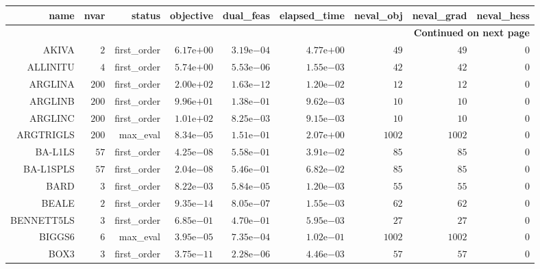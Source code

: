 \begin{longtable}{rrrrrrrrr}
\hline
name & nvar & status & objective & dual\_feas & elapsed\_time & neval\_obj & neval\_grad & neval\_hess \\\hline
\endhead
\hline
\multicolumn{9}{r}{{\bfseries Continued on next page}}\\
\hline
\endfoot
\endlastfoot
AKIVA & \(     2\) & first\_order & \( 6.17\)e\(+00\) & \( 3.19\)e\(-04\) & \( 4.77\)e\(+00\) & \(    49\) & \(    49\) & \(     0\) \\
ALLINITU & \(     4\) & first\_order & \( 5.74\)e\(+00\) & \( 5.53\)e\(-06\) & \( 1.55\)e\(-03\) & \(    42\) & \(    42\) & \(     0\) \\
ARGLINA & \(   200\) & first\_order & \( 2.00\)e\(+02\) & \( 1.63\)e\(-12\) & \( 1.20\)e\(-02\) & \(    12\) & \(    12\) & \(     0\) \\
ARGLINB & \(   200\) & first\_order & \( 9.96\)e\(+01\) & \( 1.38\)e\(-01\) & \( 9.62\)e\(-03\) & \(    10\) & \(    10\) & \(     0\) \\
ARGLINC & \(   200\) & first\_order & \( 1.01\)e\(+02\) & \( 8.25\)e\(-03\) & \( 9.15\)e\(-03\) & \(    10\) & \(    10\) & \(     0\) \\
ARGTRIGLS & \(   200\) & max\_eval & \( 8.34\)e\(-05\) & \( 1.51\)e\(-01\) & \( 2.07\)e\(+00\) & \(  1002\) & \(  1002\) & \(     0\) \\
BA-L1LS & \(    57\) & first\_order & \( 4.25\)e\(-08\) & \( 5.58\)e\(-01\) & \( 3.91\)e\(-02\) & \(    85\) & \(    85\) & \(     0\) \\
BA-L1SPLS & \(    57\) & first\_order & \( 2.04\)e\(-08\) & \( 5.46\)e\(-01\) & \( 6.82\)e\(-02\) & \(    85\) & \(    85\) & \(     0\) \\
BARD & \(     3\) & first\_order & \( 8.22\)e\(-03\) & \( 5.84\)e\(-05\) & \( 1.20\)e\(-03\) & \(    55\) & \(    55\) & \(     0\) \\
BEALE & \(     2\) & first\_order & \( 9.35\)e\(-14\) & \( 8.05\)e\(-07\) & \( 1.55\)e\(-03\) & \(    62\) & \(    62\) & \(     0\) \\
BENNETT5LS & \(     3\) & first\_order & \( 6.85\)e\(-01\) & \( 4.70\)e\(-01\) & \( 5.95\)e\(-03\) & \(    27\) & \(    27\) & \(     0\) \\
BIGGS6 & \(     6\) & max\_eval & \( 3.95\)e\(-05\) & \( 7.35\)e\(-04\) & \( 1.02\)e\(-01\) & \(  1002\) & \(  1002\) & \(     0\) \\
BOX3 & \(     3\) & first\_order & \( 3.75\)e\(-11\) & \( 2.28\)e\(-06\) & \( 4.46\)e\(-03\) & \(    57\) & \(    57\) & \(     0\) \\

\end{longtable}
